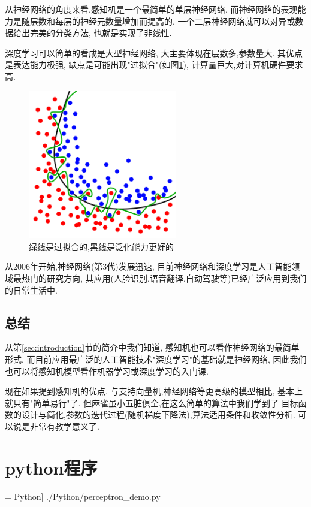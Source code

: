 \documentclass[a4paper,12pt]{article}
\begin{document}
			从神经网络的角度来看,感知机是一个最简单的单层神经网络,
			而神经网络的表现能力是随层数和每层的神经元数量增加而提高的.
			一个二层神经网络就可以对异或数据给出完美的分类方法,
			也就是实现了非线性.

			深度学习可以简单的看成是大型神经网络,
			大主要体现在层数多,参数量大.
			其优点是表达能力极强,
			缺点是可能出现"过拟合"(如图\ref{fig:overfitting}),
			计算量巨大,对计算机硬件要求高.

			\begin{figure}[htbp]
				\centering
				\includegraphics[width=6.5cm]{./fig/Overfitting.png}
				\caption{绿线是过拟合的,黑线是泛化能力更好的}\label{fig:overfitting}
			\end{figure}

			从2006年开始,神经网络(第3代)发展迅速,
			目前神经网络和深度学习是人工智能领域最热门的研究方向,
			其应用(人脸识别,语音翻译,自动驾驶等)已经广泛应用到我们的日常生活中.

		\subsection{总结}
			从第\ref{sec:introduction}节的简介中我们知道,
			感知机也可以看作神经网络的最简单形式,
			而目前应用最广泛的人工智能技术"深度学习"的基础就是神经网络,
			因此我们也可以将感知机模型看作机器学习或深度学习的入门课.

			现在如果提到感知机的优点,
			与支持向量机,神经网络等更高级的模型相比,
			基本上就只有"简单易行"了.
			但麻雀虽小五脏俱全,在这么简单的算法中我们学到了
			目标函数的设计与简化,参数的迭代过程(随机梯度下降法),算法适用条件和收敛性分析.
			可以说是非常有教学意义了.


	\appendix
		
		\section{python程序}
		\label{sec:pythoncode}
		     = Python] { ./Python/perceptron_demo.py }
\end{document}
